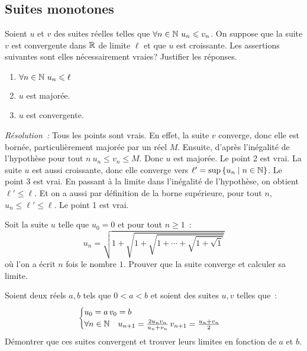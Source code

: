 \subsection{Suites monotones}
\begin{exercice}
    Soient \(u\) et \(v\) des suites réelles telles que \(\forall n
    \in \mathbb{N} \ u_n \leqslant v_n\). On suppose que la suite \(v\) est
    convergente dans \(\mathbb{R}\) de limite \(\ell\) et que \(u\) est
    croissante. Les assertions suivantes sont elles nécessairement
    vraies? Justifier les réponses.
    \begin{enumerate}
        \item \(\forall n \in \mathbb{N} \ u_n \leqslant \ell\)
        \item \(u\) est majorée.
        \item \(u\) est convergente.
    \end{enumerate}
\end{exercice}
\emph{Résolution~:} Tous les points sont vrais. En effet, la suite
\(v\) converge, donc elle est bornée, particulièrement majorée par
un réel \(M\). Ensuite, d'après l'inégalité de l'hypothèse pour
tout \(n \ u_n \leqslant v_n \leqslant M\). Donc \(u\) est
majorée. Le point 2 est vrai. La suite \(u\) est aussi croissante,
donc elle converge vers \(\ell' = \sup\left\{u_n\mathrel{}\middle|\mathrel{}n\in \mathbb{N}\right\}\). Le
point 3 est vrai. En passant à la limite dans l'inégalité de
l'hypothèse, on obtient \(\ell' \leqslant \ell\). Et on a aussi
par définition de la borne supérieure, pour tout \(n\), \(u_n
\leqslant \ell' \leqslant \ell\). Le point 1 est vrai.
\begin{exercice}
    Soit la suite \(u\) telle que \(u_0 = 0\) et pour tout \(n
    \geqslant 1\)~:
    \[u_n = \sqrt{1 + \sqrt{1 + \sqrt{1 + \cdots +\sqrt{1 + \sqrt{1}}}}}\]
    où l'on a écrit \(n\) fois le nombre \(1\). Prouver que la suite
    converge et calculer sa limite.
\end{exercice}
\begin{exercice}
    Soient deux réels \(a, b\) tels que \(0 < a < b\) et soient des
    suites \(u, v\) telles que~:
    \[ \begin{cases} u_0 = a \, v_0 = b \\ \forall n \in \mathbb{N} \quad
        u_{n+1} = \frac{2 u_n v_n}{u_n + v_n} \, v_{n+1} =
    \frac{u_n+v_n}{2} \end{cases}\]
    Démontrer que ces suites convergent et trouver leurs limites en
    fonction de \(a\) et \(b\).
\end{exercice}
